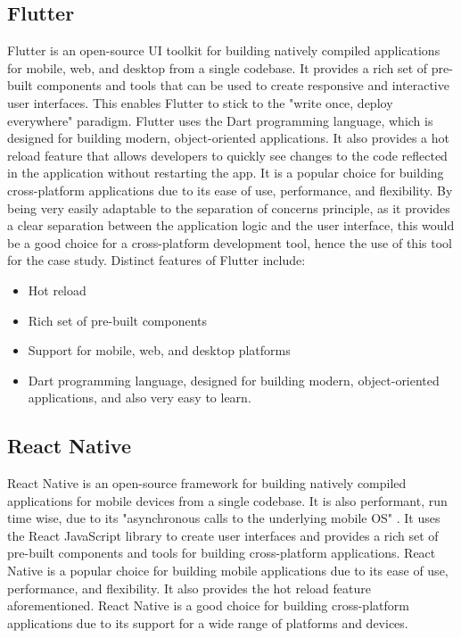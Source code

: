 \subsection{Flutter}
Flutter is an open-source UI toolkit for building natively compiled applications for mobile, web, and desktop from a single codebase.
It provides a rich set of pre-built components and tools that can be used to create responsive and interactive user interfaces.
This enables Flutter to stick to the "write once, deploy everywhere" \cite{flutterQ} paradigm.
Flutter uses the Dart programming language, which is designed for building modern, object-oriented applications.
It also provides a hot reload feature that allows developers to quickly see changes to the code reflected in the application without restarting the app.
It is a popular choice for building cross-platform applications due to its ease of use, performance, and flexibility.
By being very easily adaptable to the separation of concerns principle, as it provides a clear separation between the application logic and the user interface, this would be a good choice for a cross-platform development tool, hence the use of this tool for the case study.
Distinct features of Flutter include:
\begin{itemize}
    \item Hot reload
    \item Rich set of pre-built components
    \item Support for mobile, web, and desktop platforms
    \item Dart programming language, designed for building modern, object-oriented applications, and also very easy to learn.
\end{itemize}

\subsection{React Native}
React Native is an open-source framework for building natively compiled applications for mobile devices from a single codebase.
It is also performant, run time wise, due to its "asynchronous calls to the underlying mobile OS" \cite{reactNativeQ}.
It uses the React JavaScript library to create user interfaces and provides a rich set of pre-built components and tools for building cross-platform applications.
React Native is a popular choice for building mobile applications due to its ease of use, performance, and flexibility.
It also provides the hot reload feature aforementioned. 
React Native is a good choice for building cross-platform applications due to its support for a wide range of platforms and devices.

